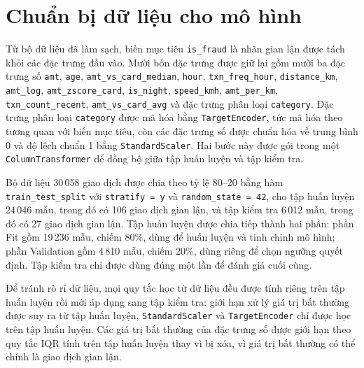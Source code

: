 \section{Chuẩn bị dữ liệu cho mô hình}
Từ bộ dữ liệu đã làm sạch, biến mục tiêu \texttt{is\_fraud} là nhãn gian lận được tách khỏi các đặc trưng đầu vào. Mười bốn đặc trưng được giữ lại gồm mười ba đặc trưng số \texttt{amt}, \texttt{age}, \texttt{amt\_vs\_card\_median}, \texttt{hour}, \texttt{txn\_freq\_hour}, \texttt{distance\_km}, \texttt{amt\_log}, \texttt{amt\_zscore\_card}, \texttt{is\_night}, \texttt{speed\_kmh}, \texttt{amt\_per\_km}, \texttt{txn\_count\_recent}, \texttt{amt\_vs\_card\_avg} và đặc trưng phân loại \texttt{category}. Đặc trưng phân loại \texttt{category} được mã hóa bằng \texttt{TargetEncoder}, tức mã hóa theo tương quan với biến mục tiêu, còn các đặc trưng số được chuẩn hóa về trung bình 0 và độ lệch chuẩn 1 bằng \texttt{StandardScaler}. Hai bước này được gói trong một \texttt{ColumnTransformer} \cite{pedregosa2011scikit} để đồng bộ giữa tập huấn luyện và tập kiểm tra.

Bộ dữ liệu 30\,058 giao dịch được chia theo tỷ lệ 80–20 bằng hàm \texttt{train\_test\_split} với \texttt{stratify = y} và \texttt{random\_state = 42}, cho tập huấn luyện 24\,046 mẫu, trong đó có 106 giao dịch gian lận, và tập kiểm tra 6\,012 mẫu, trong đó có 27 giao dịch gian lận. Tập huấn luyện được chia tiếp thành hai phần: phần Fit gồm 19\,236 mẫu, chiếm 80\%, dùng để huấn luyện và tinh chỉnh mô hình; phần Validation gồm 4\,810 mẫu, chiếm 20\%, dùng riêng để chọn ngưỡng quyết định. Tập kiểm tra chỉ được dùng đúng một lần để đánh giá cuối cùng.

Để tránh rò rỉ dữ liệu, mọi quy tắc học từ dữ liệu đều được tính riêng trên tập huấn luyện rồi mới áp dụng sang tập kiểm tra: giới hạn xử lý giá trị bất thường được suy ra từ tập huấn luyện, \texttt{StandardScaler} và \texttt{TargetEncoder} chỉ được học trên tập huấn luyện. Các giá trị bất thường của đặc trưng số được giới hạn theo quy tắc IQR tính trên tập huấn luyện thay vì bị xóa, vì giá trị bất thường có thể chính là giao dịch gian lận.

